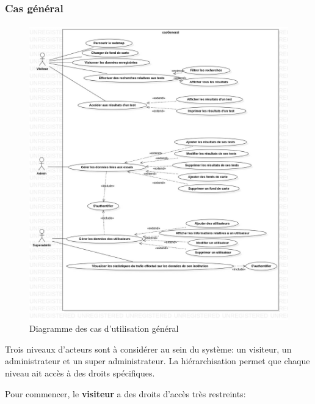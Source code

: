     \subsubsection{Cas général}
    \paragraph{}
    \begin{figure}
        \centering
        \includegraphics[width=1\textwidth]{images/Analyse_des_besoins/casGeneral.jpg}
        \caption{Diagramme des cas d'utilisation général}
    \end{figure}
    \par 
    Trois niveaux d'acteurs sont à considérer au sein du système: un visiteur, 
    un administrateur et un super administrateur. La hiérarchisation permet que 
    chaque niveau ait accès à des droits spécifiques. \par 
Pour commencer, le \textbf{visiteur} a des droits d'accès très restreints: \par 
